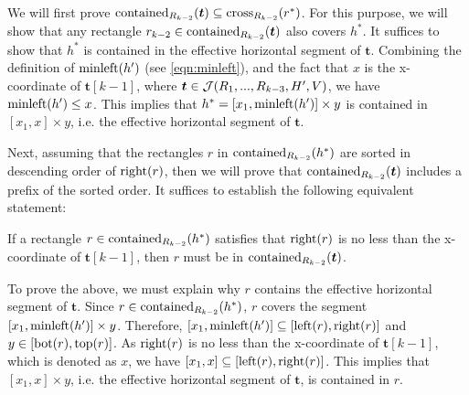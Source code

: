 \vgap

We will first prove $\mathrm{contained}_{R_{k-2}}(\textrm{\boldmath${t}$})\subseteq \mathrm{cross}_{R_{k-2}}(r^*)$. For this purpose, we will show that any rectangle $r_{k-2} \in \mathrm{contained}_{R_{k-2}}(\textrm{\boldmath${t}$})$ also covers $h^*$. It suffices to show that $h^*$ is contained in the effective horizontal segment of $\bm{t}$. Combining the definition of $\mathrm{minleft}(h')$ (see \eqref{eqn:minleft}), and the fact that $x$ is the x-coordinate of $\bm{t}[k-1]$, where $\textrm{\boldmath${t}$} \in \mathcal{J}(R_1,...,R_{k-3},H',V)$, we have $\mathrm{minleft}(h') \le x$. This implies that $h^* = [x_1, \mathrm{minleft}(h')] \times y$ is contained in $[x_1, x] \times y$, i.e. the effective horizontal segment of $\bm{t}$. 

\vgap

Next, assuming that the rectangles $r$ in $\mathrm{contained}_{R_{k-2}}(h^*)$ are sorted in descending order of $\mathrm{right}(r)$, then we will prove that $\mathrm{contained}_{R_{k-2}}(\textrm{\boldmath${t}$})$ includes a prefix of the sorted order. It suffices to establish the following equivalent statement:

\vgap

 {
    If a rectangle $r \in \mathrm{contained}_{R_{k-2}}(h^*)$ satisfies that $\mathrm{right}(r)$ is no less than the x-coordinate of $\bm{t}[k-1]$, then $r$ must be in $\mathrm{contained}_{R_{k-2}}(\textrm{\boldmath${t}$})$.
}

\vgap

\noindent To prove the above, we must explain why $r$ contains the effective horizontal segment of $\bm{t}$. Since $r \in \mathrm{contained}_{R_{k-2}}(h^*)$, $r$ covers the segment $[x_1, \mathrm{minleft}(h')] \times y$. Therefore, $[x_1, \mathrm{minleft}(h')] \subseteq [\mathrm{left}(r), \mathrm{right}(r)]$ and $y \in [\mathrm{bot}(r), \mathrm{top}(r)]$.
As $\mathrm{right}(r)$ is no less than the x-coordinate of $\bm{t}[k-1]$, which is denoted as $x$, we have $[x_1, x] \subseteq [\mathrm{left}(r), \mathrm{right}(r)]$. This implies that $[x_1, x] \times y$, i.e. the effective horizontal segment of $\bm{t}$, is contained in $r$. 
